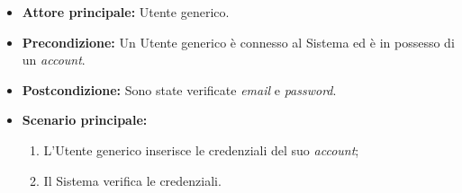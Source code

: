 \label{usecase:Accesso tradizionale}
\begin{itemize}

	\item \textbf{Attore principale:} Utente generico.

	\item \textbf{Precondizione:} Un Utente generico è connesso al Sistema ed è in possesso di un \textit{account}.

	\item \textbf{Postcondizione:} Sono state verificate \textit{email} e \textit{password}.

	\item \textbf{Scenario principale:}
	\begin{enumerate}
		\item L'Utente generico inserisce le credenziali del suo \textit{account};
		\item Il Sistema verifica le credenziali.
	\end{enumerate}

\end{itemize}
